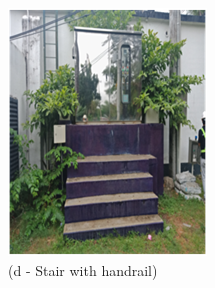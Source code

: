 \begin{figure}[!h]
\begin{minipage}[b]{0.22\linewidth}
		\includegraphics[width=\textwidth]{figures/fig_ch04_fdas_stairewithhandrail}
		\caption*{(d - Stair with handrail)}	
	\end{minipage}
	\hspace{0.03cm}
	\begin{minipage}[b]{0.22\linewidth}

\end{minipage}
\end{figure}
